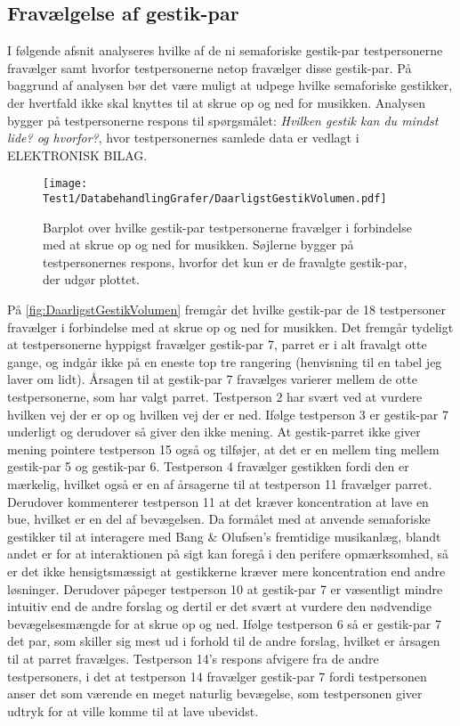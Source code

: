 \subsection{Fravælgelse af gestik-par}
\label{TestresultaterVolumenDaarlig}
%
I følgende afsnit analyseres hvilke af de ni semaforiske gestik-par testpersonerne fravælger samt hvorfor testpersonerne netop fravælger disse gestik-par. På baggrund af analysen bør det være muligt at udpege hvilke semaforiske gestikker, der hvertfald ikke skal knyttes til at skrue op og ned for musikken. Analysen bygger på testpersonerne respons til spørgsmålet: \textit{Hvilken gestik kan du mindst lide? og hvorfor?}, hvor testpersonernes samlede data er vedlagt i ELEKTRONISK BILAG.
%
\begin{figure}[H]
	\centering
	\texttt{[image: Test1/DatabehandlingGrafer/DaarligstGestikVolumen.pdf]}
	\caption{Barplot over hvilke gestik-par testpersonerne fravælger i forbindelse med at skrue op og ned for musikken. Søjlerne bygger på testpersonernes respons, hvorfor det kun er de fravalgte gestik-par, der udgør plottet.}
	\label{fig:DaarligstGestikVolumen}
\end{figure}
\noindent
%
På \autoref{fig:DaarligstGestikVolumen} fremgår det hvilke gestik-par de 18 testpersoner fravælger i forbindelse med at skrue op og ned for musikken. Det fremgår tydeligt at testpersonerne hyppigst fravælger gestik-par 7, parret er i alt fravalgt otte gange, og indgår ikke på en eneste top tre rangering (henvisning til en tabel jeg laver om lidt). Årsagen til at gestik-par 7 fravælges varierer mellem de otte testpersonerne, som har valgt parret. Testperson 2 har svært ved at vurdere hvilken vej der er op og hvilken vej der er ned. Ifølge testperson 3 er gestik-par 7 underligt og derudover så giver den ikke mening. At gestik-parret ikke giver mening pointere testperson 15 også og tilføjer, at det er en mellem ting mellem gestik-par 5 og gestik-par 6. Testperson 4 fravælger gestikken fordi den er mærkelig, hvilket også er en af årsagerne til at testperson 11 fravælger parret. Derudover kommenterer testperson 11 at det kræver koncentration at lave en bue, hvilket er en del af bevægelsen. Da formålet med at anvende semaforiske gestikker til at interagere med Bang $\&$ Olufsen's fremtidige musikanlæg, blandt andet er for at interaktionen på sigt kan foregå i den perifere opmærksomhed, så er det ikke hensigtsmæssigt at gestikkerne kræver mere koncentration end andre løsninger. Derudover påpeger testperson 10 at gestik-par 7 er væsentligt mindre intuitiv end de andre forslag og dertil er det svært at vurdere den nødvendige bevægelsesmængde for at skrue op og ned. Ifølge testperson 6 så er gestik-par 7 det par, som skiller sig mest ud i forhold til de andre forslag, hvilket er årsagen til at parret fravælges. Testperson 14's respons afvigere fra de andre testpersoners, i det at testperson 14 fravælger gestik-par 7 fordi testpersonen anser det som værende en meget naturlig bevægelse, som testpersonen giver udtryk for at ville komme til at lave ubevidst.

